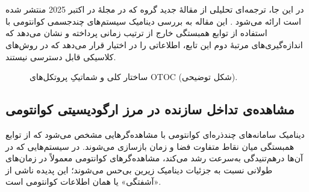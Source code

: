 
\chapter{}
\label{chap:otoc-translation}

\graphicspath{{figs/}}

در این جا، ترجمه‌ای تحلیلی از مقالهٔ جدید گروه 
که در مجلهٔ  در اکتبر 2025 منتشر شده است ارائه می‌شود \cite{google2025observation}. این مقاله به بررسی دینامیک سیستم‌های چندجسمی کوانتومی با استفاده از توابع همبستگی خارج از ترتیب زمانی  
پرداخته و نشان می‌دهد که اندازه‌گیری‌های مرتبهٔ دوم این تابع، اطلاعاتی را در اختیار قرار می‌دهد که در روش‌های کلاسیکی قابل دسترسی نیستند.
\begin{figure}[htbp]
	\centering
	\caption{ساختار کلی و شماتیکِ پروتکل‌های OTOC (شکل توضیحی). }
	\label{fig:otoc-protocol}
\end{figure}
\section{مشاهده‌ی تداخل سازنده در مرز ارگودیسیتی کوانتومی}
\label{sec:intro}

دینامیک سامانه‌های چندذره‌ای کوانتومی با مشاهده‌گرهایی مشخص می‌شود که از توابع همبستگی میان نقاط متفاوت فضا و زمان بازسازی می‌شوند. در سیستم‌هایی که در آن‌ها درهم‌تنیدگی به‌سرعت رشد می‌کند، مشاهده‌گرهای کوانتومی معمولاً در زمان‌های طولانی نسبت به جزئیات دینامیک زیرین بی‌حس می‌شوند؛ این پدیده ناشی از «آشفتگی» یا همان  اطلاعات کوانتومی است. 

